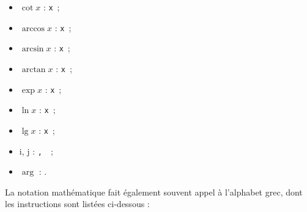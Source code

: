 \documentclass[a4paper, 11pt, twoside, fleqn]{memoir}
\begin{document}
\begin{multicols}{2}
\begin{itemize}
\item \(\cot x\) : \texttt{\cot x} \,;
\item \(\arccos x\) : \texttt{\arccos x} \,;
\item \(\arcsin x\) : \texttt{\arcsin x} \,;
\item \(\arctan x\) : \texttt{\arctan x} \,;
\item \(\exp x\) : \texttt{\exp x} \,;
\item \(\ln x\) : \texttt{\ln x} \,;
\item \(\lg x\) : \texttt{\lg x} \,;
\item \(\mathrm{i}\), \(\mathrm{j}\) : \texttt{, } \,;
\item \(\arg\) : \texttt{\arg} .
\end{itemize}
\end{multicols}

La notation mathématique fait également souvent appel à l'alphabet grec, dont les instructions sont listées ci-dessous :
\end{document}
